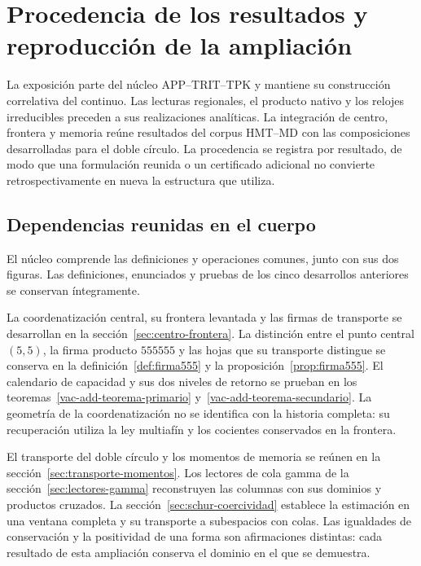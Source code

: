 \section{Procedencia de los resultados y reproducción de la ampliación}
\label{ap:procedencia-reproduccion}
\begingroup
\setlength{\parskip}{1pt}

La exposición parte del núcleo APP--TRIT--TPK y mantiene su construcción
correlativa del continuo. Las lecturas regionales, el producto nativo y los
relojes irreducibles preceden a sus realizaciones analíticas. La integración
de centro, frontera y memoria reúne resultados del corpus HMT--MD con
las composiciones desarrolladas para el doble círculo. La procedencia se
registra por resultado, de modo que una formulación reunida o un certificado
adicional no convierte retrospectivamente en nueva la estructura que utiliza.

\subsection{Dependencias reunidas en el cuerpo}

El núcleo comprende las definiciones y operaciones comunes, junto con
sus dos figuras. Las definiciones, enunciados y pruebas de los cinco
desarrollos anteriores se conservan íntegramente.

La coordenatización central, su frontera levantada y las firmas de transporte se
desarrollan en la sección~\ref{sec:centro-frontera}. La distinción entre
el punto central \((5,5)\), la firma producto \(555555\) y las hojas que
su transporte distingue se conserva en la definición~\ref{def:firma555}
y la proposición~\ref{prop:firma555}. El calendario de capacidad y sus
dos niveles de retorno se prueban en los
teoremas~\ref{vac-add-teorema-primario} y~\ref{vac-add-teorema-secundario}.
La geometría de la coordenatización no se identifica con la historia completa: su
recuperación utiliza la ley multiafín y los cocientes conservados en la frontera.

El transporte del doble círculo y los momentos de memoria se reúnen en
la sección~\ref{sec:transporte-momentos}. Los lectores de cola gamma de
la sección~\ref{sec:lectores-gamma} reconstruyen las columnas con sus
dominios y productos cruzados. La sección~\ref{sec:schur-coercividad}
establece la estimación en una ventana completa y su transporte a
subespacios con colas. Las igualdades de conservación y la positividad
de una forma son afirmaciones distintas: cada resultado de esta ampliación
conserva el dominio en el que se demuestra.

